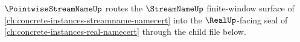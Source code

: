 $\PointwiseStreamNameUp$ routes the $\StreamNameUp$ finite-window surface of \autoref{ch:concrete-instances-streamname-namecert} into the $\RealUp$-facing seal of \autoref{ch:concrete-instances-real-namecert} through the child file below.


